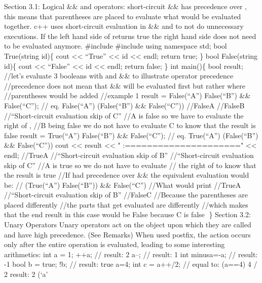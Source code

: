 Section 3.1: Logical \&\& and \textbar\textbar{} operators:
short-circuit \&\& has precedence over \textbar\textbar, this means that
parentheses are placed to evaluate what would be evaluated together. c++
uses short-circuit evaluation in \&\& and \textbar\textbar{} to not do
unnecessary executions. If the left hand side of \textbar\textbar{}
returns true the right hand side does not need to be evaluated anymore.
\#include \#include using namespace std; bool True(string id)\{ cout
\textless\textless{} ``True'' \textless\textless{} id
\textless\textless{} endl; return true; \} bool False(string id)\{ cout
\textless\textless{} ``False'' \textless\textless{} id
\textless\textless{} endl; return false; \} int main()\{ bool result;
//let's evaluate 3 booleans with \textbar\textbar{} and \&\& to
illustrate operator precedence //precedence does not mean that \&\& will
be evaluated first but rather where\\
//parentheses would be added //example 1 result = False(``A'')
\textbar\textbar{} False(``B'') \&\& False(``C''); // eq. False(``A'')
\textbar\textbar{} (False(``B'') \&\& False(``C'')) //FalseA //FalseB
//``Short-circuit evaluation skip of C'' //A is false so we have to
evaluate the right of \textbar\textbar, //B being false we do not have
to evaluate C to know that the result is false result = True(``A'')
\textbar\textbar{} False(``B'') \&\& False(``C''); // eq. True(``A'')
\textbar\textbar{} (False(``B'') \&\& False(``C'')) cout
\textless\textless{} result \textless\textless{} "
:=====================" \textless\textless{} endl; //TrueA
//``Short-circuit evaluation skip of B'' //``Short-circuit evaluation
skip of C'' //A is true so we do not have to evaluate // the right of
\textbar\textbar{} to know that the result is true //If
\textbar\textbar{} had precedence over \&\& the equivalent evaluation
would be: // (True(``A'') \textbar\textbar{} False(``B'')) \&\&
False(``C'') //What would print //TrueA //``Short-circuit evaluation
skip of B'' //FalseC //Because the parentheses are placed differently
//the parts that get evaluated are differently //which makes that the
end result in this case would be False because C is false \} Section
3.2: Unary Operators Unary operators act on the object upon which they
are called and have high precedence. (See Remarks) When used postﬁx, the
action occurs only after the entire operation is evaluated, leading to
some interesting arithmetics: int a = 1; ++a; // result: 2 a--; //
result: 1 int minusa=-a; // result: -1 bool b = true; !b; // result:
true a=4; int c = a++/2; // equal to: (a==4) 4 / 2 result: 2 (`a'
